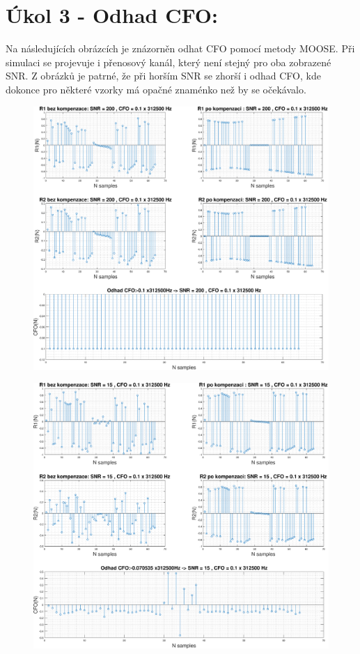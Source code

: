 \documentclass[10pt, a4paper]{article}%
\begin{document}
    \section*{\Large Úkol 3 - Odhad CFO:}
    Na následujících obrázcích je znázorněn odhat CFO pomocí metody MOOSE. Při simulaci se projevuje i přenosový kanál, který
    není stejný pro oba zobrazené SNR. Z obrázků je patrné, že při horším SNR se zhorší i odhad CFO, kde dokonce pro některé
    vzorky má opačné znaménko než by se očekávalo.

    \begin{figure}[ht!]
        \centering
        \includegraphics[height = 0.45\textheight]{cviceni/SNR_200.eps}
    \end{figure}

    \begin{figure}[ht!]
        \centering
        \includegraphics[height = 0.45\textheight]{cviceni/SNR_15.eps}
    \end{figure}
    \clearpage
\end{document}
